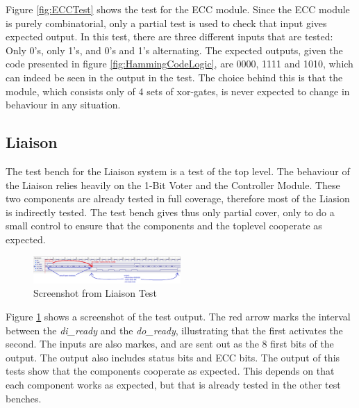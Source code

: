 \documentclass[a4paper]{IEEEtran}
\begin{document}
Figure \ref{fig:ECCTest} shows the test for the ECC module.
Since the ECC module is purely combinatorial, only a partial test is used to check that input gives expected output.
In this test, there are three different inputs that are tested: Only 0's, only 1's, and 0's and 1's alternating. The expected outputs, given the code presented in figure \ref{fig:HammingCodeLogic}, are 0000, 1111 and 1010, which can indeed be seen in the output in the test.
The choice behind this is that the module, which consists only of 4 sets of xor-gates, is never expected to change in behaviour in any situation.

\subsection{ Liaison }
The test bench for the Liaison system is a test of the top level.
The behaviour of the Liaison relies heavily on the 1-Bit Voter and the Controller Module.
These two components are already tested in full coverage, therefore most of the Liasion is indirectly tested.
The test bench gives thus only partial cover, only to do a small control to ensure that the components and the toplevel cooperate as expected.

\begin{figure}[h!]
    \centering
    \includegraphics[width=0.5\textwidth]{Figures/Tests/LiaisonTest}
    \caption{Screenshot from Liaison Test}
    \label{fig:LiaisonTests}
\end{figure}

Figure \ref{fig:LiaisonTests} shows a screenshot of the test output.
The red arrow marks the interval between the \textit{di\_ready} and the \textit{do\_ready}, illustrating that the first activates the second.
The inputs are also markes, and are sent out as the 8 first bits of the output.
The output also includes status bits and ECC bits.
The output of this tests show that the components cooperate as expected.
This depends on that each component works as expected, but that is already tested in the other test benches.
\end{document}
